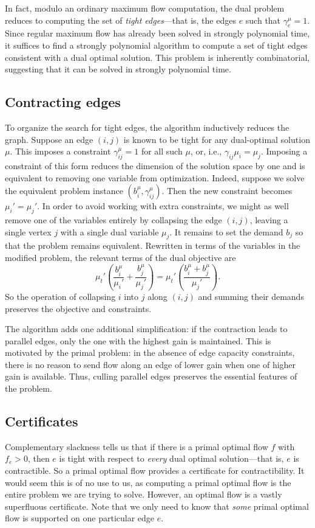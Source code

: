 \documentclass[11pt]{article}
\theoremstyle{definition}
\theoremstyle{definition}
\newcommand{\biu}{b_{i}^{\mu}}
\newcommand{\gij}{\gamma_{ij}}
\newcommand{\geu}{\gamma_e^{\mu}}
\newcommand{\giij}{\gamma_{ij}^{\mu}}
\begin{document}
    In fact, modulo an ordinary maximum flow computation, the dual problem reduces to computing
    the set of \emph{tight edges}---that is, the edges $e$ such that $\geu = 1$. Since regular maximum
    flow has already been solved in strongly polynomial time, it suffices to find a strongly polynomial
    algorithm to compute a set of tight edges consistent with a dual optimal solution. This problem
    is inherently combinatorial, suggesting that it can be solved in strongly polynomial time.
    
    \subsection{Contracting edges}
    To organize the search for tight edges, the algorithm inductively reduces the graph.
    Suppose an edge $(i, j)$ is known to be tight for any dual-optimal solution $\mu$. This
    imposes a constraint $\giij = 1$ for all such $\mu$, or, i.e., $\gij \mu_i = \mu_j$.
    Imposing a constraint of this form reduces the dimension of the solution
    space by one and is equivalent to removing one variable from optimization. Indeed,
    suppose we solve the equivalent problem instance $(\biu, \giij)$. Then the new constraint
    becomes $\mu_i' = \mu_j'$. In order to avoid working with extra constraints, we might
    as well remove one of the variables entirely by collapsing the edge $(i, j)$, leaving a single
    vertex $j$ with a single dual variable $\mu_j$. It remains to set the demand $b_j$ so
    that the problem remains equivalent. Rewritten in terms of the variables in
    the modified problem, the relevant terms of the dual objective are
    \[ \mu_t' \left(\frac{b_i^\mu}{\mu_i'} + \frac{b_j^\mu}{\mu_j'}\right)
     = \mu_t' \left(\frac{b_i^\mu + b_j^\mu}{\mu_j'}\right). \]
	So the operation of collapsing $i$ into $j$ along $(i, j)$ and summing their demands
	preserves the objective and constraints.
	
	The algorithm adds one additional simplification: if the contraction leads to parallel edges,
	only the one with the highest gain is maintained. This is motivated by the primal problem: in
	the absence of edge capacity constraints, there is no reason to send flow along an edge of
	lower gain when one of higher gain is available. Thus, culling parallel edges preserves the
	essential features of the problem.
	
	\subsection{Certificates}
	Complementary slackness tells us that if there is a primal optimal flow $f$ with
	$f_e > 0$, then $e$ is tight with respect to \emph{every} dual optimal solution---that
	is, $e$ is contractible. So a primal optimal flow provides a certificate for contractibility.
	It would seem this is of no use to us, as computing a primal optimal flow is the entire
	problem we are trying to solve. However, an optimal flow is a vastly superfluous certificate.
	Note that we only need to know that \emph{some}
	primal optimal flow is supported on one particular edge $e$.
	
\end{document}
